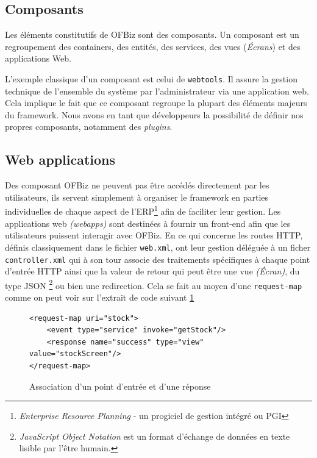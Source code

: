 \subsection{Composants}
Les éléments constitutifs de OFBiz sont des composants. Un composant est un regroupement des containers, des entités, des services, des vues (\emph{Écrans}) et des applications Web.


L'exemple classique d'un composant est celui de \verb|webtools|. Il assure la gestion technique de l'ensemble du système par l'administrateur via une application web. Cela implique le fait que ce composant regroupe la plupart des éléments majeurs du framework.
Nous avons en tant que développeurs la possibilité de définir nos propres composants, notamment des \emph{plugins}. 
  
\subsection{Web applications}
Des composant OFBiz ne peuvent pas être accédés directement par les utilisateurs, ils servent simplement à organiser le framework en parties individuelles de chaque aspect de l'ERP\footnote{  \emph{ Enterprise Resource Planning }- un progiciel de gestion intégré ou PGI} afin de faciliter leur gestion. Les applications web \emph{(webapps)} sont destinées à fournir un front-end afin que les utilisateurs puissent interagir avec OFBiz. En ce qui concerne les routes HTTP, définis classiquement dans le fichier \verb|web.xml|, ont leur gestion déléguée à un ficher \verb|controller.xml| qui à son tour associe des traitements spécifiques à chaque point d'entrée HTTP ainsi que la valeur de retour qui peut être une vue \emph{(Écran)}, du type JSON \footnote{ \emph{JavaScript Object Notation} est un format d'échange de données en texte lisible par l'être humain. } ou bien une redirection. Cela se fait au moyen d'une \verb|request-map| comme on peut voir sur l'extrait de code suivant \ref{reqmap}



\lstset{language=XML}
\begin{figure}
\begin{lstlisting}[frame=leftline]
<request-map uri="stock">
    <event type="service" invoke="getStock"/>
    <response name="success" type="view" value="stockScreen"/>
</request-map>
\end{lstlisting}
	\caption{Association d'un point d'entrée et d'une réponse}
\label{reqmap}
\end{figure}



